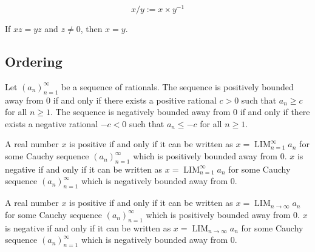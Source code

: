\documentclass{blog}
\DeclareMathOperator{\LIM}{LIM}
\begin{document}
\begin{definition}[divisiona]
  \begin{equation}
    x / y := x \times y^{-1}
  \end{equation}
\end{definition}

\begin{proposition}
  If $x z = yz$ and $z \neq 0$, then $x = y$.
\end{proposition}

\subsection{Ordering}
\begin{definition}
  Let $(a_{n})_{n = 1}^{\infty}$ be a sequence of rationals.
  The sequence is positively bounded away from 0 if and only if
  there exists a positive rational $c > 0$ such that
  $a_{n} \geq c$ for all $n \geq 1$.
  The sequence is negatively bounded away from 0 if and only if
  there exists a negative rational $-c < 0$ such that
  $a_{n} \leq -c$ for all $n \geq 1$.
\end{definition}

\begin{definition}
  A real number $x$ is positive if and only if it can be written as
  $x = \LIM_{n = 1}^{\infty} a_{n}$ for some Cauchy sequence $(a_{n})_{n = 1}^{\infty}$
  which is positively bounded away from 0.
  $x$ is negative if and only if it can be written as
  $x = \LIM_{n = 1}^{\infty} a_{n}$ for some Cauchy sequence $(a_{n})_{n = 1}^{\infty}$
  which is negatively bounded away from 0.
\end{definition}

\begin{definition}
  A real number $x$ is positive if and only if it can be written as
  $x = \LIM_{n \to \infty} a_{n}$ for some Cauchy sequence $(a_{n})_{n = 1}^{\infty}$
  which is positively bounded away from 0.
  $x$ is negative if and only if it can be written as
  $x = \LIM_{n \to \infty} a_{n}$ for some Cauchy sequence $(a_{n})_{n = 1}^{\infty}$
  which is negatively bounded away from 0.
\end{definition}
\end{document}

